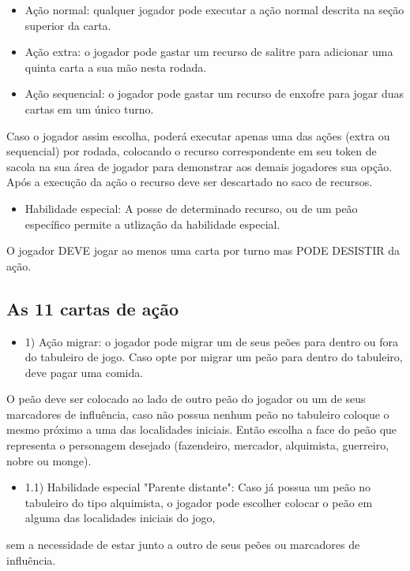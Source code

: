 \documentclass[11pt]{article}
\begin{document}
\begin{itemize}
\item Ação normal: qualquer jogador pode executar a ação normal descrita na seção superior da carta.
\item Ação extra: o jogador pode gastar um recurso de salitre para adicionar uma quinta carta a sua mão nesta rodada.
\item Ação sequencial: o jogador pode gastar um recurso de enxofre para jogar duas cartas em um único turno.
\end{itemize}

Caso o jogador assim escolha, poderá executar apenas uma das ações (extra ou sequencial) por rodada, colocando o recurso correspondente em seu token de sacola na sua área de jogador
para demonstrar aos demais jogadores sua opção.
Após a execução da ação o recurso deve ser descartado no saco de recursos.

\begin{itemize}
\item Habilidade especial: A posse de determinado recurso, ou de um peão específico permite a utlização da habilidade especial.
\end{itemize}

O jogador DEVE jogar ao menos uma carta por turno mas PODE DESISTIR da ação.

\subsection{As 11 cartas de ação}
\label{sec:orgheadline6}


\begin{itemize}
\item 1) Ação migrar: o jogador pode migrar um de seus peões para dentro ou fora do tabuleiro de jogo. Caso opte por migrar um peão para dentro do tabuleiro, deve pagar uma comida.
\end{itemize}
O peão deve ser colocado ao lado de outro peão do jogador ou um de seus marcadores de influência, caso não possua nenhum peão no tabuleiro coloque o mesmo próximo a uma das localidades
iniciais. Então escolha a face do peão que representa o personagem desejado (fazendeiro, mercador, alquimista, guerreiro, nobre ou monge).

\begin{itemize}
\item 1.1) Habilidade especial "Parente distante": Caso já possua um peão no tabuleiro do tipo alquimista, o jogador pode escolher colocar o peão em alguma das localidades iniciais do jogo,
\end{itemize}
sem a necessidade de estar junto a outro de seus peões ou marcadores de influência.
\end{document}
